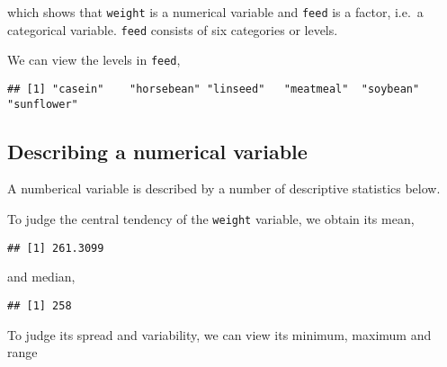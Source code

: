 \documentclass[]{book}
\newenvironment{Shaded}{\begin{snugshade}}{\end{snugshade}}
\newcommand{\KeywordTok}[1]{\textcolor[rgb]{0.13,0.29,0.53}{\textbf{#1}}}
\newcommand{\OperatorTok}[1]{\textcolor[rgb]{0.81,0.36,0.00}{\textbf{#1}}}
\newcommand{\NormalTok}[1]{#1}
\theoremstyle{definition}
\theoremstyle{definition}
\theoremstyle{remark}
\begin{document}
which shows that \texttt{weight} is a numerical variable and
\texttt{feed} is a factor, i.e.~a categorical variable. \texttt{feed}
consists of six categories or levels.

We can view the levels in \texttt{feed},

\begin{Shaded}
\end{Shaded}

\begin{verbatim}
## [1] "casein"    "horsebean" "linseed"   "meatmeal"  "soybean"   "sunflower"
\end{verbatim}

\subsection{Describing a numerical
variable}\label{describing-a-numerical-variable}

A numberical variable is described by a number of descriptive statistics
below.

To judge the central tendency of the \texttt{weight} variable, we obtain
its mean,

\begin{Shaded}
\end{Shaded}

\begin{verbatim}
## [1] 261.3099
\end{verbatim}

and median,

\begin{Shaded}
\end{Shaded}

\begin{verbatim}
## [1] 258
\end{verbatim}

To judge its spread and variability, we can view its minimum, maximum
and range

\begin{Shaded}
\end{Shaded}
\end{document}
